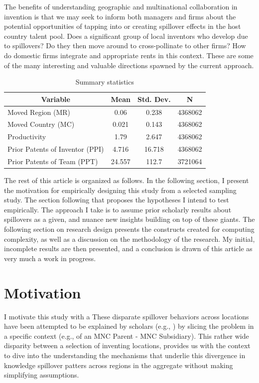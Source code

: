 \documentclass[12pt]{article}
\begin{document}
The benefits of understanding geographic and multinational collaboration in invention is that we may seek to inform both managers and firms about the potential opportunities of tapping into or creating spillover effects in the host country talent pool. Does a significant group of local inventors who develop due to spillovers? Do they then move around to cross-pollinate to other firms? How do domestic firms integrate and appropriate rents in this context. These are some of the many interesting and valuable directions spawned by the current approach. 

\begin{table}[htbp]\centering \caption{Summary statistics \label{sumstat}}
\begin{tabular}{l c c  c}\hline\hline
\multicolumn{1}{c}{\textbf{Variable}} & \textbf{Mean}
 & \textbf{Std. Dev.} & \textbf{N}\\ \hline
Moved Region (MR) & 0.06 & 0.238  & 4368062\\
Moved Country (MC) & 0.021 & 0.143  & 4368062\\
Productivity & 1.79 & 2.647  & 4368062\\
Prior Patents of Inventor (PPI) & 4.716 & 16.718  & 4368062\\
Prior Patents of Team (PPT) & 24.557 & 112.7  & 3721064\\
\hline
\end{tabular}
\end{table}



The rest of this article is organized as follows. In the following section, I present the motivation for empirically designing this study from a selected sampling study. The section following that proposes the hypotheses I intend to test empirically. The approach I take is to assume prior scholarly results about spillovers as a given, and nuance new insights building on top of these giants. The following section on research design presents the constructs created for computing complexity, as well as a discussion on the methodology of the research. My initial, incomplete results are then presented, and a conclusion is drawn of this article as very much a work in progress.

\section{Motivation}
I motivate this study with a These disparate spillover behaviors across locations have been attempted to be explained by scholars (e.g., \cite{Zhao2006, Singh2007}) by slicing the problem in a specific context (e.g., of an MNC Parent - MNC Subsidiary). This rather wide disparity between a selection of inventing locations, provides us with the context to dive into the understanding the mechanisms that underlie this divergence in knowledge spillover patters across regions in the aggregate without making simplifying assumptions.
\end{document}
